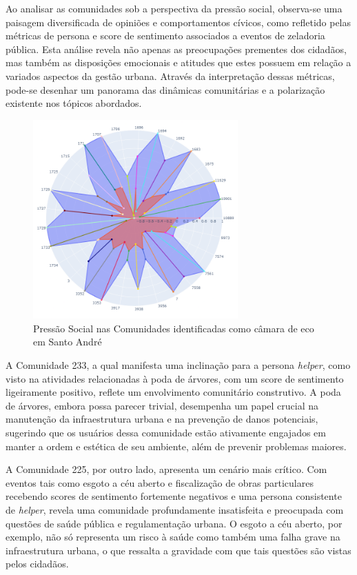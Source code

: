 Ao analisar as comunidades sob a perspectiva da pressão social, observa-se uma paisagem diversificada de opiniões e comportamentos cívicos, como refletido pelas métricas de persona e score de sentimento associados a eventos de zeladoria pública. Esta análise revela não apenas as preocupações prementes dos cidadãos, mas também as disposições emocionais e atitudes que estes possuem em relação a variados aspectos da gestão urbana. Através da interpretação dessas métricas, pode-se desenhar um panorama das dinâmicas comunitárias e a polarização existente nos tópicos abordados.

\begin{figure}[htb]
	\centering
	\includegraphics[width=0.7\textwidth]{images/echo_chambers_santo_andre_social_pressure.png}
	\caption{Pressão Social nas Comunidades identificadas como câmara de eco em Santo André}
	\label{fig:echo_chambers_santo_andre_social_pressure}
\end{figure}

A Comunidade 233, a qual manifesta uma inclinação para a persona \textit{helper}, como visto na atividades relacionadas à poda de árvores, com um score de sentimento ligeiramente positivo, reflete um envolvimento comunitário construtivo. A poda de árvores, embora possa parecer trivial, desempenha um papel crucial na manutenção da infraestrutura urbana e na prevenção de danos potenciais, sugerindo que os usuários dessa comunidade estão ativamente engajados em manter a ordem e estética de seu ambiente, além de prevenir problemas maiores.

A Comunidade 225, por outro lado, apresenta um cenário mais crítico. Com eventos tais como esgoto a céu aberto e fiscalização de obras particulares recebendo scores de sentimento fortemente negativos e uma persona consistente de \textit{helper}, revela uma comunidade profundamente insatisfeita e preocupada com questões de saúde pública e regulamentação urbana. O esgoto a céu aberto, por exemplo, não só representa um risco à saúde como também uma falha grave na infraestrutura urbana, o que ressalta a gravidade com que tais questões são vistas pelos cidadãos.


